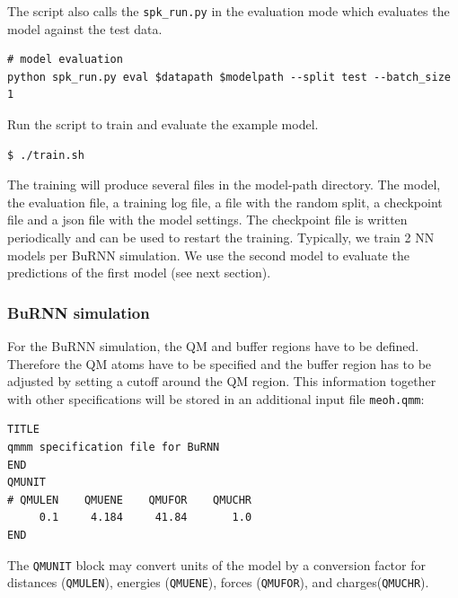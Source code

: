 The script also calls the \texttt{spk\_run.py} in the evaluation mode which evaluates the model against the test data.

\begin{lstlisting}[breaklines=true, breakatwhitespace=false]
# model evaluation
python spk_run.py eval $datapath $modelpath --split test --batch_size 1
\end{lstlisting}

Run the script to train and evaluate the example model.

\begin{lstlisting}[breaklines=true, breakatwhitespace=false]
$ ./train.sh
\end{lstlisting}

The training will produce several files in the model-path directory. The model, the evaluation file, a training log file, a file with the random split, a checkpoint file and a json file with the model settings. The checkpoint file is written periodically and can be used to restart the training. Typically, we train 2 NN models per BuRNN simulation. We use the second model to evaluate the predictions of the first model (see next section).




\subsubsection{BuRNN simulation}
For the BuRNN simulation, the QM and buffer regions have to be defined. Therefore the QM atoms have to be specified and the buffer region has to be adjusted by setting a cutoff around the QM region. This information together with other specifications will be stored in an additional input file \texttt{meoh.qmm}:

\begin{lstlisting}[breaklines=true, breakatwhitespace=false]
TITLE
qmmm specification file for BuRNN  
END
QMUNIT
# QMULEN    QMUENE    QMUFOR    QMUCHR
     0.1     4.184     41.84       1.0
END
\end{lstlisting}

The \texttt{QMUNIT} block may convert units of the model by a conversion factor for distances (\texttt{QMULEN}), energies (\texttt{QMUENE}), forces (\texttt{QMUFOR}), and charges(\texttt{QMUCHR}).

